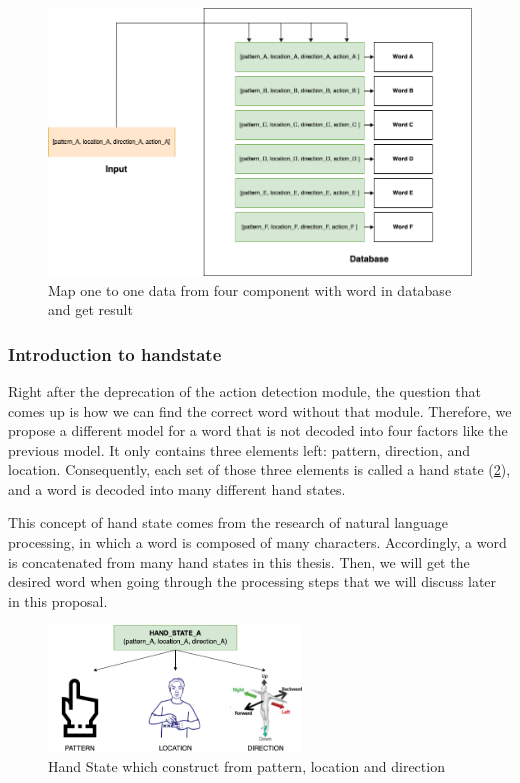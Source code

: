 \begin{figure}[H]
	\centering
	\includegraphics[width=\textwidth]{img/Chap4/MapWord.png}
	\caption{Map one to one data from four component with word in database and get result}
	\label{fig:Chap4-MapWord}
\end{figure}

\subsubsection{ Introduction to handstate }

Right after the deprecation of the action detection module, the question that comes up is how we can find the correct word without that module. Therefore, we propose a different model for a word that is not decoded into four factors like the previous model. It only contains three elements left: pattern, direction, and location. Consequently, each set of those three elements is called a hand state (\ref{fig:Chap4-HandState}), and a word is decoded into many different hand states.

This concept of hand state comes from the research of natural language processing, in which a word is composed of many characters. Accordingly, a word is concatenated from many hand states in this thesis. Then, we will get the desired word when going through the processing steps that we will discuss later in this proposal.

\begin{figure}[H]
  \centering
  \includegraphics[width=0.6\textwidth]{img/Chap4/HandState.png}
  \caption{ Hand State which construct from pattern, location and direction}
  \label{fig:Chap4-HandState}
\end{figure}

